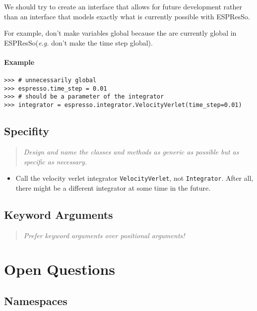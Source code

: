 \documentclass[
a4paper,                        %
11pt,                           %
]{scrartcl}
\newcommand{\es}{\mbox{\textsf{ESPResSo}}\xspace}
\newcommand{\eg}{\textit{e.g.}\xspace}
\newenvironment{designrule}{\begin{quote}\itshape}{\end{quote}}
\begin{document}
We should try to create an interface that allows for future
development rather than an interface that models exactly what is
currently possible with \es.

For example, don't make variables global because the are currently
global in \es (\eg don't make the time step global).

\paragraph{Example}
\begin{verbatim}
>>> # unnecessarily global
>>> espresso.time_step = 0.01
>>> # should be a parameter of the integrator
>>> integrator = espresso.integrator.VelocityVerlet(time_step=0.01)
\end{verbatim}

\subsection{Specifity}

\begin{designrule}
  Design and name the classes and methods as generic as possible but
  as specific as necessary.
\end{designrule}

\begin{itemize}
\item Call the velocity verlet integrator \texttt{VelocityVerlet}, not
  \texttt{Integrator}. After all, there might be a different
  integrator at some time in the future.
\end{itemize}

\subsection{Keyword Arguments}

\begin{designrule}
  Prefer keyword arguments over positional arguments!
\end{designrule}

\clearpage
\section{Open Questions}

\subsection{Namespaces}
\end{document}
